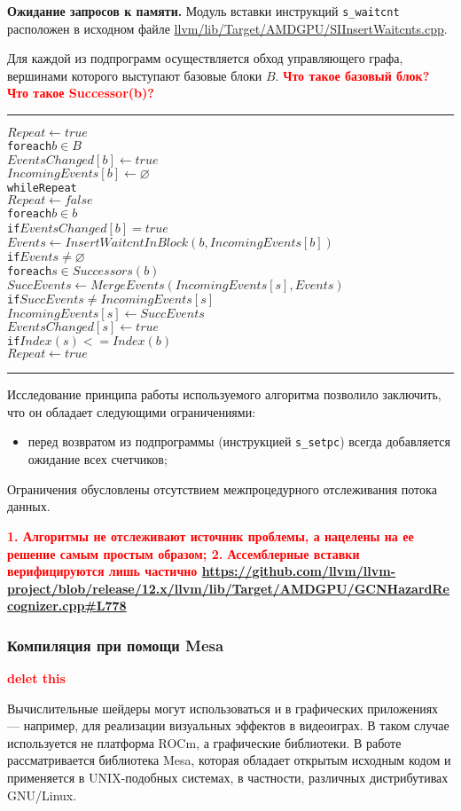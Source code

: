 \documentclass[a4paper,14pt]{extarticle}
\newcommand{\todo}[1]{\textbf{\textcolor{red}{#1}}}
\newcommand{\topic}[1]{\textbf{#1.}}
\newenvironment{ul}{\begin{itemize}[noitemsep,topsep=0em]}{\end{itemize}\vspace{4mm}}
\begin{document}
\topic{Ожидание запросов к памяти} Модуль вставки инструкций \texttt{s\_waitcnt}
расположен в исходном файле \url{llvm/lib/Target/AMDGPU/SIInsertWaitcnts.cpp}.

Для каждой из подпрограмм осуществляется обход управляющего графа,
вершинами которого выступают базовые блоки $B$. \todo{Что такое базовый блок? Что такое Successor(b)?}

\vspace{1em}\hrule
\begin{alltt}
\(Repeat \gets true\)
for each \(b \in B\)
  \(EventsChanged[b] \gets true\)
  \(IncomingEvents[b] \gets \varnothing\)
while Repeat
  \(Repeat \gets false\)
  for each \(b \in b\)
    if \(EventsChanged[b] = true\)
      \(Events \gets InsertWaitcntInBlock(b, IncomingEvents[b])\)
      if \(Events \neq \varnothing\)
        for each \(s \in Successors(b)\)
          \(SuccEvents \gets MergeEvents(IncomingEvents[s], Events)\)
          if \(SuccEvents \neq IncomingEvents[s]\)
            \(IncomingEvents[s] \gets SuccEvents\)
            \(EventsChanged[s] \gets true\)
            if \(Index(s) <= Index(b)\)
              \(Repeat \gets true\)
\end{alltt}
\hrule\vspace{1em}

Исследование принципа работы используемого алгоритма позволило заключить, что
он обладает следующими ограничениями:
\begin{ul}
\item перед возвратом из подпрограммы (инструкцией \texttt{s\_setpc}) всегда
  добавляется ожидание всех счетчиков;
\end{ul}

Ограничения обусловлены отсутствием межпроцедурного отслеживания потока данных.


\todo{1. Алгоритмы не отслеживают источник проблемы, а нацелены на ее решение самым простым образом;
2. Ассемблерные вставки верифицируются лишь частично \url{https://github.com/llvm/llvm-project/blob/release/12.x/llvm/lib/Target/AMDGPU/GCNHazardRecognizer.cpp\#L778}}

\subsubsection{Компиляция при помощи Mesa}

\todo{delet this}

Вычислительные шейдеры могут использоваться и в графических приложениях — например,
для реализации визуальных эффектов в видеоиграх. В таком случае используется
не платформа ROCm, а графические библиотеки. В работе рассматривается библиотека
Mesa, которая обладает открытым исходным кодом и применяется в UNIX-подобных
системах, в частности, различных дистрибутивах GNU/Linux.
\end{document}
